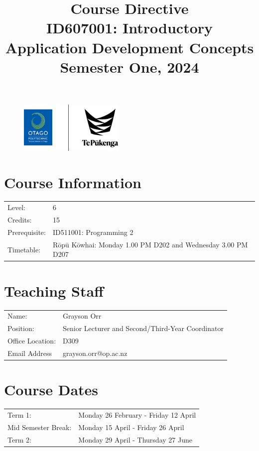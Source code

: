 \documentclass{article}
\author{}
\begin{document}
\begin{figure}
	\centering
	\includegraphics[width=50mm]{../img/logo.png}
\end{figure}

\title{Course Directive\\ID607001: Introductory Application Development Concepts\\Semester One, 2024}
\date{}
\maketitle 

\section*{Course Information}
\begin{tabular}{ll}
	Level:        & 6 \\
	Credits:      & 15                                                             \\
	Prerequisite: & ID511001: Programming 2                                                   \\
	Timetable:    & Rōpū Kōwhai: Monday 1.00 PM D202 and Wednesday 3.00 PM D207  \\
\end{tabular}

\section*{Teaching Staff}
\begin{tabular}{ll}
	Name:            & Grayson Orr                           \\
	Position:        & Senior Lecturer and Second/Third-Year Coordinator\\
	Office Location: & D309                                 \\
	Email Address    & grayson.orr@op.ac.nz                    \\
\end{tabular}

\section*{Course Dates}
\begin{tabular}{ll}
	Term 1:           & Monday 26 February - Friday 12 April  \\
	Mid Semester Break: &  Monday 15 April  - Friday 26 April     \\
	Term 2:             & Monday 29 April - Thursday 27 June       \\
\end{tabular}
\end{document}
